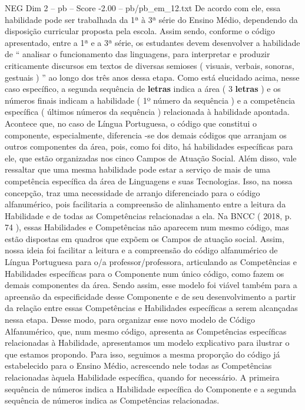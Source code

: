 \begin{textsample}{NEG Dim 2 – pb – Score -2.00 – pb/pb\_em\_12.txt}
De acordo com ele, essa habilidade pode ser trabalhada da 1ª à 3ª série do Ensino Médio, dependendo da disposição curricular proposta pela escola.
Assim sendo, conforme o código apresentado, entre a 1ª e a 3ª série, os estudantes devem desenvolver a habilidade de “ analisar o funcionamento das linguagens, para interpretar e produzir criticamente discursos em textos de diversas semioses ( visuais, verbais, sonoras, gestuais ) ” ao longo dos três anos dessa etapa.
Como está elucidado acima, nesse caso específico, a segunda sequência de \textbf{letras} indica a área ( 3 \textbf{letras} ) e os números finais indicam a habilidade ( 1º número da sequência ) e a competência específica ( últimos números da sequência ) relacionada à habilidade apontada.
Acontece que, no caso de Língua Portuguesa, o código que constitui o componente, especialmente, diferencia -se dos demais códigos que arranjam os outros componentes da área, pois, como foi dito, há habilidades específicas para ele, que estão organizadas nos cinco Campos de Atuação Social.
Além disso, vale ressaltar que uma mesma habilidade pode estar a serviço de mais de uma competência específica da área de Linguagens e suas Tecnologias.
Isso, na nossa concepção, traz uma necessidade de arranjo diferenciado para o código alfanumérico, pois facilitaria a compreensão de alinhamento entre a leitura da Habilidade e de todas as Competências relacionadas a ela.
Na BNCC ( 2018, p. 74 ), essas Habilidades e Competências não aparecem num mesmo código, mas estão dispostas em quadros que expõem os Campos de atuação social.
Assim, nossa ideia foi facilitar a leitura e a compreensão do código alfanumérico de Língua Portuguesa para o/a professor/professora, articulando as Competências e Habilidades específicas para o Componente num único código, como fazem os demais componentes da área.
Sendo assim, esse modelo foi viável também para a apreensão da especificidade desse Componente e de seu desenvolvimento a partir da relação entre essas Competências e Habilidades específicas a serem alcançadas nessa etapa.
Desse modo, para organizar esse novo modelo de Código Alfanumérico, que, num mesmo código, apresenta as Competências específicas relacionadas à Habilidade, apresentamos um modelo explicativo para ilustrar o que estamos propondo.
Para isso, seguimos a mesma proporção do código já estabelecido para o Ensino Médio, acrescendo nele todas as Competências relacionadas àquela Habilidade específica, quando for necessário.
A primeira sequência de números indica a Habilidade específica do Componente e a segunda sequência de números indica as Competências relacionadas.

\end{textsample}
